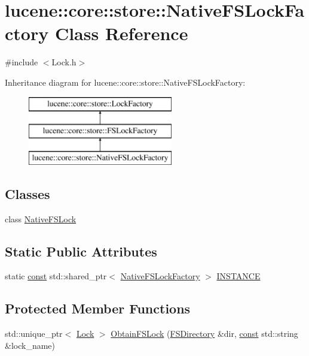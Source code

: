 \hypertarget{classlucene_1_1core_1_1store_1_1NativeFSLockFactory}{}\section{lucene\+:\+:core\+:\+:store\+:\+:Native\+F\+S\+Lock\+Factory Class Reference}
\label{classlucene_1_1core_1_1store_1_1NativeFSLockFactory}


{\ttfamily \#include $<$Lock.\+h$>$}

Inheritance diagram for lucene\+:\+:core\+:\+:store\+:\+:Native\+F\+S\+Lock\+Factory\+:\begin{figure}[H]
\begin{center}
\leavevmode
\includegraphics[height=3.000000cm]{classlucene_1_1core_1_1store_1_1NativeFSLockFactory}
\end{center}
\end{figure}
\subsection*{Classes}
\begin{DoxyCompactItemize}
\item 
class \mbox{\hyperlink{classlucene_1_1core_1_1store_1_1NativeFSLockFactory_1_1NativeFSLock}{Native\+F\+S\+Lock}}
\end{DoxyCompactItemize}
\subsection*{Static Public Attributes}
\begin{DoxyCompactItemize}
\item 
static \mbox{\hyperlink{ZlibCrc32_8h_a2c212835823e3c54a8ab6d95c652660e}{const}} std\+::shared\+\_\+ptr$<$ \mbox{\hyperlink{classlucene_1_1core_1_1store_1_1NativeFSLockFactory}{Native\+F\+S\+Lock\+Factory}} $>$ \mbox{\hyperlink{classlucene_1_1core_1_1store_1_1NativeFSLockFactory_a475cce1dec3dd6cfe86a48d0fc9d0512}{I\+N\+S\+T\+A\+N\+CE}}
\end{DoxyCompactItemize}
\subsection*{Protected Member Functions}
\begin{DoxyCompactItemize}
\item 
std\+::unique\+\_\+ptr$<$ \mbox{\hyperlink{classlucene_1_1core_1_1store_1_1Lock}{Lock}} $>$ \mbox{\hyperlink{classlucene_1_1core_1_1store_1_1NativeFSLockFactory_af41d7358d9d8b4dab47bc4a443ddd1ee}{Obtain\+F\+S\+Lock}} (\mbox{\hyperlink{classlucene_1_1core_1_1store_1_1FSDirectory}{F\+S\+Directory}} \&dir, \mbox{\hyperlink{ZlibCrc32_8h_a2c212835823e3c54a8ab6d95c652660e}{const}} std\+::string \&lock\+\_\+name)
\end{DoxyCompactItemize}
